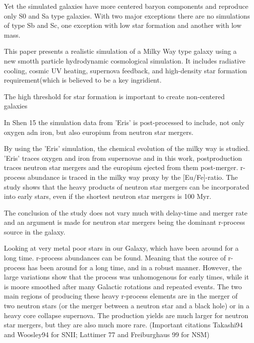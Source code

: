 Yet the simulated galaxies have more centered baryon components and reproduce only S0 and Sa type galaxies. With two major exceptions there are no simulations of type Sb and Sc, one exception with low star formation and another with low mass.

This paper presents a realistic simulation of a Milky Way type galaxy using a new smotth particle hydrodynamic cosmological simulation. It includes radiative cooling, cosmic UV heating, supernova feedback, and high-density star formation requirement(which is believed to be a key ingridient.

The high threshold for star formation is important to create non-centered galaxies

In Shen 15  the simulation data from 'Eris' is post-processed to include, not only oxygen adn iron, but also europium from neutron star mergers.

By using the 'Eris' simulation\cite{guedes11}, the chemical evolution of the milky way is studied.
'Eris' traces oxygen and iron from supernovae and in this work, postproduction traces neutron star mergers and the europium ejected from them post-merger.
r-process abundance is traced in the milky way proxy by the [Eu/Fe]-ratio.
The study shows that the heavy products of neutron star mergers can be incorporated into early stars, even if the shortest neutron star mergers is 100 Myr.

The conclusion of the study does not vary much with delay-time and merger rate and an argument is made for neutron star mergers being the dominant r-process source in the galaxy.

Looking at very metal poor stars in our Galaxy, which have been around for a long time. r-process abundances can be found. Meaning that the source of r-process has been around for a long time, and in a robust manner. However, the large variations show that the process was unhomogenous for early times, while it is moore smoothed after many Galactic rotations and repeated events.
The two main regions of producing these heavy r-process elements are in the merger of two neutron stars (or the merger between a neutron star and a black hole) or in a heavy core collapse supernova. The production yields are much larger for neutron star mergers, but they are also much more rare.
(Important citations Takashi94 and Woosley94 for SNII; Lattimer 77 and Freiburghaus 99 for NSM)


